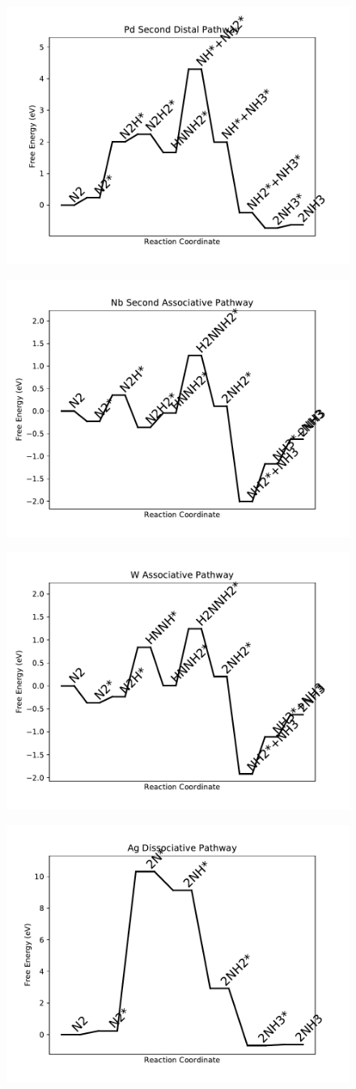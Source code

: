 \documentclass[journal=jacsat,manuscript=article]{achemso}
\begin{document}
\begin{figure}
\includegraphics[width=0.5\linewidth]{data/plots/Pd_distal_2.pdf}
\label{fig:Pd_distal_2}
\end{figure}

\newpage
\begin{figure}
\includegraphics[width=0.5\linewidth]{data/plots/Nb_associative_2.pdf}
\label{fig:Nb_associative_2}
\end{figure}

\begin{figure}
\includegraphics[width=0.5\linewidth]{data/plots/W_associative.pdf}
\label{fig:W_associative}
\end{figure}

\newpage
\begin{figure}
\includegraphics[width=0.5\linewidth]{data/plots/Ag_dissociative.pdf}
\label{fig:Ag_dissociative}
\end{figure}
\end{document}
